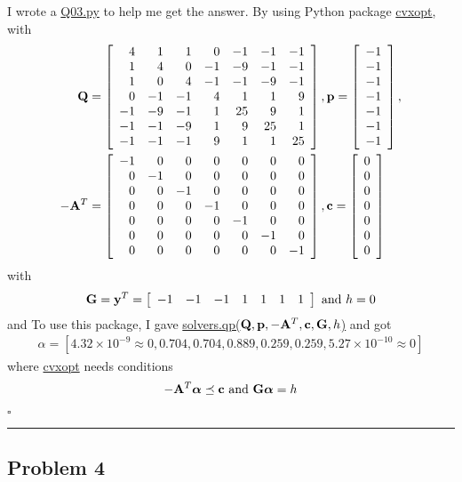 \documentclass[12pt]{article}
\newcommand*{\QEDB}{\hfill\ensuremath{\square}}
\newcommand{\SBrackets}[1]{\left[#1\right]}
\newcommand{\BF}[1]{{\bf#1}}
\newcommand{\SciNum}[2]{#1\times{10}^{#2}}
\newcommand{\Matrix}[2]{\SBrackets{\begin{array}{#1}#2\end{array}}}
\newcommand{\horrule}[1]{\rule{\linewidth}{#1}}
\begin{document}
I wrote a \url{Q03.py} to help me get the answer. By using Python package \url{cvxopt}, with
\begin{align}
\BF{Q}&=\Matrix{rrrrrrr}{4&1&1&0&-1&-1&-1\\1&4&0&-1&-9&-1&-1\\1&0&4&-1&-1&-9&-1\\0&-1&-1&4&1&1&9\\-1&-9&-1&1&25&9&1\\-1&-1&-9&1&9&25&1\\-1&-1&-1&9&1&1&25},\BF{p}=\Matrix{r}{-1\\-1\\-1\\-1\\-1\\-1\\-1},\\
-\BF{A}^T&=\Matrix{rrrrrrr}{-1&0&0&0&0&0&0\\0&-1&0&0&0&0&0\\0&0&-1&0&0&0&0\\0&0&0&-1&0&0&0\\0&0&0&0&-1&0&0\\0&0&0&0&0&-1&0\\0&0&0&0&0&0&-1},\BF{c}=\Matrix{c}{0\\0\\0\\0\\0\\0\\0}
\end{align}
with
\begin{align}
\BF{G}=\BF{y}^T=\Matrix{ccccccc}{-1&-1&-1&1&1&1&1}\text{ and }h=0
\end{align}
and
To use this package, I gave \url{solvers.qp(}$\BF{Q}, \BF{p}, -\BF{A}^T, \BF{c},\BF{G},h$\url{)} and got
\begin{align}
\alpha=\SBrackets{\SciNum{4.32}{-9}\approx0,0.704,0.704,0.889,0.259,0.259,\SciNum{5.27}{-10}\approx0}
\end{align}
where \url{cvxopt} needs conditions
\begin{align}
-\BF{A}^T{\bm\alpha}\preceq\BF{c}\text{ and }\BF{G}\bm{\alpha}=h
\end{align}

\QEDB

\horrule{0.5pt}

\subsection*{Problem 4}
\end{document}
